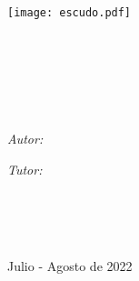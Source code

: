\graphicspath{{./front-page/figures/}}
\begin{titlepage}
\begin{center}

\vfill
\texttt{[image: escudo.pdf]}\\[0.2cm]
{\scshape\LARGE \univname\par}\vspace{0.3cm} %
\textsc{\Large \facultyname}\\[0.3cm] %
\Large \worktype\\ [0.2cm]

\HRule \\[0.4cm] %
{\Large \bfseries \ttitle\par}\vspace{0.4cm} %
\HRule \\[0.5cm] %

\begin{minipage}[t]{0.4\textwidth}
\begin{flushleft} \large
\emph{Autor:}\\
\authorname %
\end{flushleft}
\end{minipage}
\begin{minipage}[t]{0.4\textwidth}
\begin{flushright} \large
\emph{Tutor:} \\
\supname %
\end{flushright}
\end{minipage}\\[1.5cm]

\vfill


\large
\deptname\\[0cm] %
\institutename\\[0cm] %


{\large Julio - Agosto de 2022}\\[4cm] %

\vfill
\end{center}
\end{titlepage}
